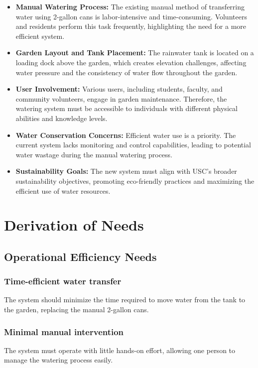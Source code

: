 \documentclass[11pt]{article}
\begin{document}
\begin{itemize}
    \item \textbf{Manual Watering Process:} The existing manual method of transferring water using 2-gallon cans is labor-intensive and time-consuming. Volunteers and residents perform this task frequently, highlighting the need for a more efficient system.
    
    \item \textbf{Garden Layout and Tank Placement:} The rainwater tank is located on a loading dock above the garden, which creates elevation challenges, affecting water pressure and the consistency of water flow throughout the garden.
    
    \item \textbf{User Involvement:} Various users, including students, faculty, and community volunteers, engage in garden maintenance. Therefore, the watering system must be accessible to individuals with different physical abilities and knowledge levels.
    
    \item \textbf{Water Conservation Concerns:} Efficient water use is a priority. The current system lacks monitoring and control capabilities, leading to potential water wastage during the manual watering process.
    
    \item \textbf{Sustainability Goals:} The new system must align with USC’s broader sustainability objectives, promoting eco-friendly practices and maximizing the efficient use of water resources.
\end{itemize}



\newpage
\section{Derivation of Needs}

\subsection{Operational Efficiency Needs}

\subsubsection{Time-efficient water transfer}
The system should minimize the time required to move water from the tank to the garden, replacing the manual 2-gallon cans.

\subsubsection{Minimal manual intervention}
The system must operate with little hands-on effort, allowing one person to manage the watering process easily.
\end{document}
